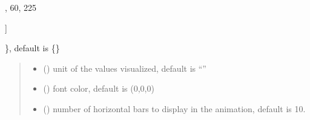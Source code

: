 \documentclass[letterpaper,10pt,english]{sphinxmanual}
\begin{document}
\begin{fulllineitems}
\begin{quote}
\begin{description}
\end{description}\end{quote}
\begin{description}
\begin{description}
\sphinxlineitem{\{}\begin{description}
\sphinxlineitem{“United States”: {[}}
,
60,
225

\end{description}

\sphinxAtStartPar
{]}

\end{description}

\sphinxAtStartPar
\}, default is \{\}

\end{description}
\begin{quote}\begin{description}
\begin{itemize}
\item {} 
\sphinxAtStartPar
{} () \textendash{} unit of the values visualized, default is “”

\item {} 
\sphinxAtStartPar
{} () \textendash{} font color, default is (0,0,0)

\item {} 
\sphinxAtStartPar
{} () \textendash{} number of horizontal bars to display in the animation, default is 10.

\end{itemize}

\end{description}\end{quote}

\begin{fulllineitems}
\label{\detokenize{index:sjvisualizer.StackedBarChart.stacked_bar_chart.draw}}
\pysigstartsignatures
{}
\pysigstopsignatures
\end{fulllineitems}


\end{fulllineitems}
\end{document}
